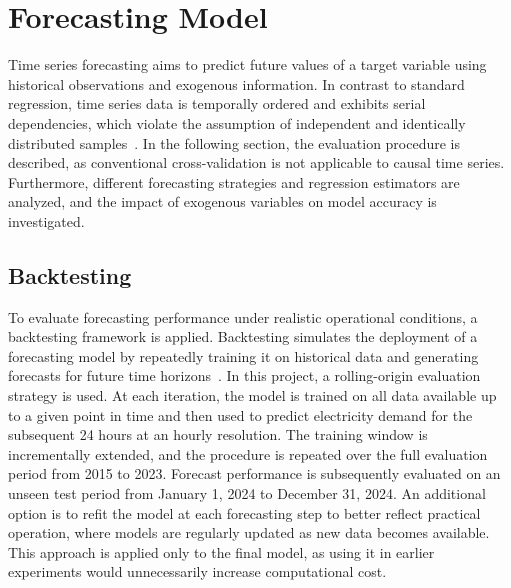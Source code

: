 \section{Forecasting Model}
\label{sec:forcasting_model_training}
Time series forecasting aims to predict future values of a target variable using historical observations and exogenous information. In contrast to standard regression, time series data is temporally ordered and exhibits serial dependencies, which violate the assumption of independent and identically distributed samples~\cite{fotakis_2021_backtesting}. In the following section, the evaluation procedure is described, as conventional cross-validation is not applicable to causal time series. Furthermore, different forecasting strategies and regression estimators are analyzed, and the impact of exogenous variables on model accuracy is investigated.

\subsection{Backtesting}
\label{sec:backtesting}
To evaluate forecasting performance under realistic operational conditions, a backtesting framework is applied. Backtesting simulates the deployment of a forecasting model by repeatedly training it on historical data and generating forecasts for future time horizons~\cite{fotakis_2021_backtesting}. In this project, a rolling-origin evaluation strategy is used. At each iteration, the model is trained on all data available up to a given point in time and then used to predict electricity demand for the subsequent 24 hours at an hourly resolution. The training window is incrementally extended, and the procedure is repeated over the full evaluation period from 2015 to 2023. Forecast performance is subsequently evaluated on an unseen test period from January 1, 2024 to December 31, 2024. An additional option is to refit the model at each forecasting step to better reflect practical operation, where models are regularly updated as new data becomes available. This approach is applied only to the final model, as using it in earlier experiments would unnecessarily increase computational cost.


